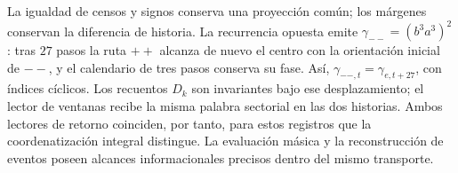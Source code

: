 La igualdad de censos y signos conserva una proyección común; los
márgenes conservan la diferencia de historia. La recurrencia opuesta
emite \(\gamma_{--}=(b^3a^3)^2\): tras \(27\) pasos la ruta
\({++}\) alcanza de nuevo el centro con la orientación inicial de
\({--}\), y el calendario de tres pasos conserva su fase. Así,
\(\gamma_{--,t}=\gamma_{e,t+27}\), con índices cíclicos.
Los recuentos \(D_k\) son invariantes bajo ese desplazamiento; el
lector de ventanas recibe la misma palabra sectorial en las dos
historias. Ambos lectores de retorno coinciden, por tanto, para
estos registros que la coordenatización integral distingue. La evaluación másica y
la reconstrucción de eventos poseen alcances informacionales
precisos dentro del mismo transporte.
